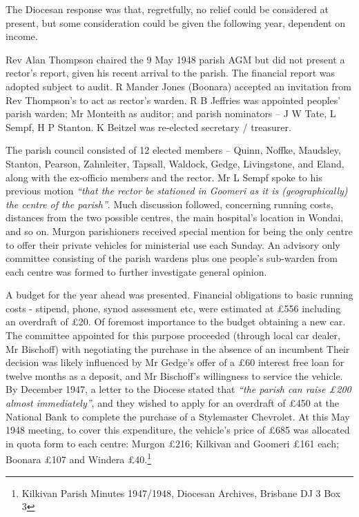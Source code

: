 The Diocesan response was that, regretfully, no relief could be considered at present, but some consideration could be given the following year, dependent on income.



Rev Alan Thompson chaired the 9 May 1948 parish AGM but did not present a rector's report, given his recent arrival to the parish. The financial report was adopted subject to audit. R Mander Jones (Boonara) accepted an invitation from Rev Thompson's to act as rector's warden. R B Jeffries was appointed peoples' parish warden; Mr Monteith as auditor; and parish nominators -- J W Tate, L Sempf, H P Stanton. K Beitzel was re-elected secretary / treasurer.



The parish council consisted of 12 elected members -- Quinn, Noffke, Maudsley, Stanton, Pearson, Zahnleiter, Tapsall, Waldock, Gedge, Livingstone, and Eland, along with the ex-officio members and the rector. Mr L Sempf spoke to his previous motion \emph{``that the rector be stationed in Goomeri as it is (geographically) the centre of the parish''}. Much discussion followed, concerning running costs, distances from the two possible centres, the main hospital's location in Wondai, and so on. Murgon parishioners received special mention for being the only centre to offer their private vehicles for ministerial use each Sunday. An advisory only committee consisting of the parish wardens plus one people's sub-warden from each centre was formed to further investigate general opinion.



A budget for the year ahead was presented. Financial obligations to basic running costs - stipend, phone, synod assessment etc, were estimated at \pounds556 including an overdraft of \pounds20. Of foremost importance to the budget obtaining a new car. The committee appointed for this purpose proceeded (through local car dealer, Mr Bischoff) with negotiating the purchase in the absence of an incumbent Their decision was likely influenced by Mr Gedge's offer of a \pounds60 interest free loan for twelve months as a deposit, and Mr Bischoff's willingness to service the vehicle. By December 1947, a letter to the Diocese stated that \emph{``the parish can raise \pounds200 almost immediately''}, and they wished to apply for an overdraft of \pounds450 at the National Bank to complete the purchase of a Stylemaster Chevrolet. At this May 1948 meeting, to cover this expenditure, the vehicle's price of \pounds685 was allocated in quota form to each centre: Murgon \pounds216; Kilkivan and Goomeri \pounds161 each; Boonara \pounds107 and Windera \pounds40.\footnote{Kilkivan Parish Minutes 1947/1948, Diocesan Archives, Brisbane DJ 3 Box 3}


